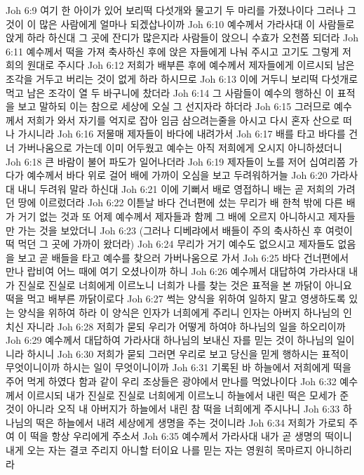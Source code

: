 Joh 6:9  여기 한 아이가 있어 보리떡 다섯개와 물고기 두 마리를 가졌나이다 그러나 그것이 이 많은 사람에게 얼마나 되겠삽나이까
Joh 6:10  예수께서 가라사대 이 사람들로 앉게 하라 하신대 그 곳에 잔디가 많은지라 사람들이 앉으니 수효가 오천쯤 되더라
Joh 6:11  예수께서 떡을 가져 축사하신 후에 앉은 자들에게 나눠 주시고 고기도 그렇게 저희의 원대로 주시다
Joh 6:12  저희가 배부른 후에 예수께서 제자들에게 이르시되 남은 조각을 거두고 버리는 것이 없게 하라 하시므로
Joh 6:13  이에 거두니 보리떡 다섯개로 먹고 남은 조각이 열 두 바구니에 찼더라
Joh 6:14  그 사람들이 예수의 행하신 이 표적을 보고 말하되 이는 참으로 세상에 오실 그 선지자라 하더라
Joh 6:15  그러므로 예수께서 저희가 와서 자기를 억지로 잡아 임금 삼으려는줄을 아시고 다시 혼자 산으로 떠나 가시니라
Joh 6:16  저물매 제자들이 바다에 내려가서
Joh 6:17  배를 타고 바다를 건너 가버나움으로 가는데 이미 어두웠고 예수는 아직 저희에게 오시지 아니하셨더니
Joh 6:18  큰 바람이 불어 파도가 일어나더라
Joh 6:19  제자들이 노를 저어 십여리쯤 가다가 예수께서 바다 위로 걸어 배에 가까이 오심을 보고 두려워하거늘
Joh 6:20  가라사대 내니 두려워 말라 하신대
Joh 6:21  이에 기뻐서 배로 영접하니 배는 곧 저희의 가려던 땅에 이르렀더라
Joh 6:22  이튿날 바다 건너편에 섰는 무리가 배 한척 밖에 다른 배가 거기 없는 것과 또 어제 예수께서 제자들과 함께 그 배에 오르지 아니하시고 제자들만 가는 것을 보았더니
Joh 6:23  (그러나 디베랴에서 배들이 주의 축사하신 후 여럿이 떡 먹던 그 곳에 가까이 왔더라)
Joh 6:24  무리가 거기 예수도 없으시고 제자들도 없음을 보고 곧 배들을 타고 예수를 찾으러 가버나움으로 가서
Joh 6:25  바다 건너편에서 만나 랍비여 어느 때에 여기 오셨나이까 하니
Joh 6:26  예수께서 대답하여 가라사대 내가 진실로 진실로 너희에게 이르노니 너희가 나를 찾는 것은 표적을 본 까닭이 아니요 떡을 먹고 배부른 까닭이로다
Joh 6:27  썩는 양식을 위하여 일하지 말고 영생하도록 있는 양식을 위하여 하라 이 양식은 인자가 너희에게 주리니 인자는 아버지 하나님의 인치신 자니라
Joh 6:28  저희가 묻되 우리가 어떻게 하여야 하나님의 일을 하오리이까
Joh 6:29  예수께서 대답하여 가라사대 하나님의 보내신 자를 믿는 것이 하나님의 일이니라 하시니
Joh 6:30  저희가 묻되 그러면 우리로 보고 당신을 믿게 행하시는 표적이 무엇이니이까 하시는 일이 무엇이니이까
Joh 6:31  기록된 바 하늘에서 저희에게 떡을 주어 먹게 하였다 함과 같이 우리 조상들은 광야에서 만나를 먹었나이다
Joh 6:32  예수께서 이르시되 내가 진실로 진실로 너희에게 이르노니 하늘에서 내린 떡은 모세가 준 것이 아니라 오직 내 아버지가 하늘에서 내린 참 떡을 너희에게 주시나니
Joh 6:33  하나님의 떡은 하늘에서 내려 세상에게 생명을 주는 것이니라
Joh 6:34  저희가 가로되 주여 이 떡을 항상 우리에게 주소서
Joh 6:35  예수께서 가라사대 내가 곧 생명의 떡이니 내게 오는 자는 결코 주리지 아니할 터이요 나를 믿는 자는 영원히 목마르지 아니하리라
